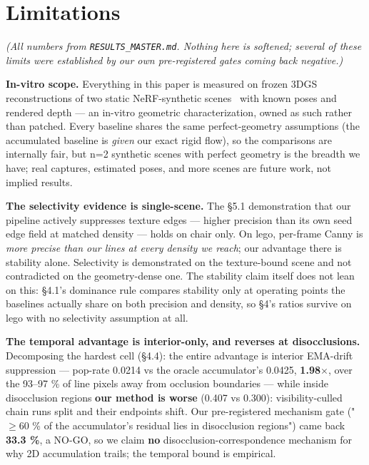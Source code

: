 \section{Limitations}
\emph{(All numbers from \texttt{RESULTS\_MASTER.md}. Nothing here is softened; several of these limits
were established by our own pre-registered gates coming back negative.)}

\textbf{In-vitro scope.} Everything in this paper is measured on frozen 3DGS reconstructions of
two static NeRF-synthetic scenes~\cite{nerf} with known poses and rendered depth --- an in-vitro
geometric characterization, owned as such rather than patched. Every baseline shares the
same perfect-geometry assumptions (the accumulated baseline is \emph{given} our exact rigid
flow), so the comparisons are internally fair, but n=2 synthetic scenes with perfect
geometry is the breadth we have; real captures, estimated poses, and more scenes are
future work, not implied results.

\textbf{The selectivity evidence is single-scene.} The \S5.1 demonstration that our pipeline
actively suppresses texture edges --- higher precision than its own seed edge field at
matched density --- holds on chair only. On lego, per-frame Canny is \emph{more precise than our
lines at every density we reach}; our advantage there is stability alone. Selectivity is
demonstrated on the texture-bound scene and not contradicted on the geometry-dense one.
The stability claim itself does not lean on this: \S4.1's dominance rule compares stability
only at operating points the baselines actually share on both precision and density, so
\S4's ratios survive on lego with no selectivity assumption at all.

\textbf{The temporal advantage is interior-only, and reverses at disocclusions.} Decomposing
the hardest cell (\S4.4): the entire advantage is interior EMA-drift suppression --- pop-rate
0.0214 vs the oracle accumulator's 0.0425, \textbf{1.98$\times$}, over the 93--97 \% of line pixels away
from occlusion boundaries --- while inside disocclusion regions \textbf{our method is worse}
(0.407 vs 0.300): visibility-culled chain runs split and their endpoints shift. Our
pre-registered mechanism gate ("$\geq$60 \% of the accumulator's residual lies in disocclusion
regions") came back \textbf{33.3 \%}, a NO-GO, so we claim \textbf{no} disocclusion-correspondence
mechanism for why 2D accumulation trails; the temporal bound is empirical.

